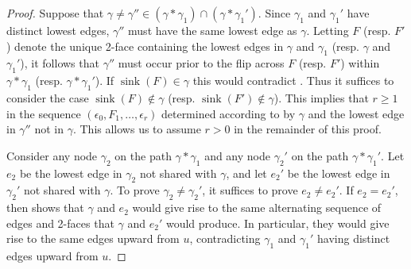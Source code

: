 \documentclass[10pt,a4paper]{amsart}
\DeclareMathOperator{\sink}{sink}
\begin{document}
\begin{proof}
Suppose that $\gamma \neq \gamma '' \in (\gamma * \gamma_1)\cap (\gamma * \gamma_1')$.
Since $\gamma_1$ and $\gamma_1'$ have distinct lowest edges, $\gamma ''$ must have the same lowest edge as $\gamma$. Letting $F$ (resp. $F'$) denote the unique 2-face containing the lowest edges in $\gamma $ and $\gamma_1 $ (resp. $\gamma $ and $\gamma_1'$), it follows that $\gamma''$ must occur prior to the flip across $F$ (resp. $F'$) within $\gamma * \gamma_1$ (resp. $\gamma * \gamma_1'$). If $\sink (F)\in \gamma $ this would contradict . Thus it suffices to consider the case
$\sink (F) \not \in \gamma $ (resp. $\sink (F') \not \in \gamma $). 
This implies that $r\ge 1$ in  the sequence $(\epsilon_0,F_1,\dots ,\epsilon_r)$ determined according to  by $\gamma$ and the lowest edge in $\gamma ''$ not in $\gamma$. This allows us to  assume $r>0$ in the remainder of this proof.

Consider any node $\gamma_2$ on the path $\gamma*\gamma_1$ and any node $\gamma_2'$ on the path $\gamma * \gamma_1'$.  Let $e_2$ be the lowest edge in $\gamma_2$ not shared with $\gamma $, and let $e_2'$ be the lowest edge in $\gamma_2' $ not shared with $\gamma $.   To prove $\gamma_2 \ne \gamma_2'$, it suffices to prove $e_2 \ne e_2'$.  If $e_2 = e_2'$, then  shows that $\gamma $ and $e_2$ would give rise to the same  alternating sequence of edges and 2-faces that  $\gamma $ and $e_2'$ would produce.  In particular, they would give rise to the same edges upward from $u$, contradicting $\gamma_1$ and $\gamma_1'$ having  distinct edges upward from $u$.
\end{proof}
\end{document}
